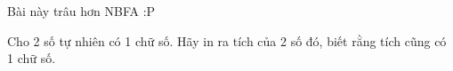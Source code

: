 Bài này trâu hơn NBFA :P  

   Cho 2 số tự nhiên có 1 chữ số. Hãy in ra tích của 2 số đó, biết rằng tích cũng có 1 chữ số.